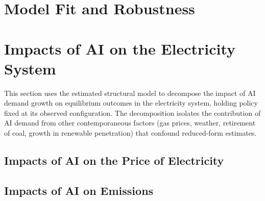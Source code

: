 \documentclass[12pt,letterpaper]{article}
\begin{document}
\section{Model Fit and Robustness}
\label{sec:fit}


\section{Impacts of AI on the Electricity System}
\label{sec:impacts}

This section uses the estimated structural model to decompose the impact
of AI demand growth on equilibrium outcomes in the electricity system,
holding policy fixed at its observed configuration. The decomposition
isolates the contribution of AI demand from other contemporaneous
factors (gas prices, weather, retirement of coal, growth in renewable
penetration) that confound reduced-form estimates.

\subsection{Impacts of AI on the Price of Electricity}


\subsection{Impacts of AI on Emissions}

\end{document}
